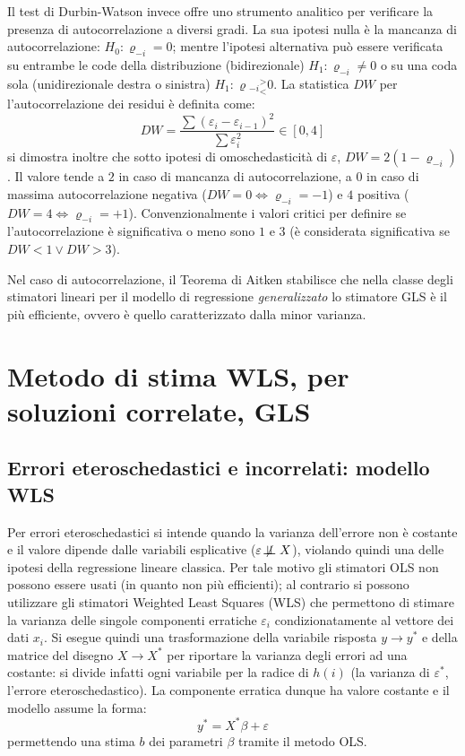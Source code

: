 \documentclass[a4page, 11pt]{article} %
\def\dep{\not\!\perp\!\!\!\perp}  %
\begin{document}
Il test di Durbin-Watson invece offre uno strumento analitico per verificare la presenza di autocorrelazione a diversi gradi.
La sua ipotesi nulla è la mancanza di autocorrelazione: $H_0: \varrho_{-i} = 0$; mentre l'ipotesi alternativa può essere verificata su entrambe le code della distribuzione (bidirezionale) $H_1: \varrho_{-i} \neq 0$ o su una coda sola (unidirezionale destra o sinistra) $H_1: \varrho{_{-i}} ^>_< 0$.
La statistica $DW$ per l'autocorrelazione dei residui è definita come:
\begin{equation*}
  DW = \frac{\sum{(\varepsilon_i - \varepsilon_{i-1})^2}}{\sum{ \varepsilon_i^2}} \in [0, 4]
\end{equation*}
si dimostra inoltre che sotto ipotesi di omoschedasticità di $\varepsilon$, $DW = 2(1 - \varrho_{-i})$.
Il valore tende a $2$ in caso di mancanza di autocorrelazione, a $0$ in caso di massima autocorrelazione negativa ($DW = 0 \Leftrightarrow \varrho_{-i} = -1$) e $4$ positiva ($DW = 4 \Leftrightarrow \varrho_{-i} = +1$).
Convenzionalmente i valori critici per definire se l'autocorrelazione è significativa o meno sono $1$ e $3$ (è considerata significativa se $DW < 1 \lor DW > 3$).

Nel caso di autocorrelazione, il Teorema di Aitken stabilisce che nella classe degli stimatori lineari per il modello di regressione \textit{generalizzato} lo stimatore GLS è il più efficiente, ovvero è quello caratterizzato dalla minor varianza.

\section{Metodo di stima WLS, per soluzioni correlate, GLS }
\subsection*{Errori eteroschedastici e incorrelati: modello WLS}
Per errori eteroschedastici si intende quando la varianza dell’errore non è costante e il valore dipende dalle variabili esplicative ($\varepsilon \dep X$), violando quindi una delle ipotesi della regressione lineare classica.
Per tale motivo gli stimatori OLS non possono essere usati (in quanto non più efficienti); al contrario si possono utilizzare gli stimatori Weighted Least Squares (WLS) che permettono di stimare la varianza delle singole componenti erratiche $\varepsilon_i$ condizionatamente al vettore dei dati $x_i$.
Si esegue quindi una trasformazione della variabile risposta $y \rightarrow y^*$ e della matrice del disegno $X \rightarrow X^*$ per riportare la varianza degli errori ad una costante: si divide infatti ogni variabile per la radice di $h(i)$ (la varianza di $\varepsilon^*$, l'errore eteroschedastico).
La componente erratica dunque ha valore costante e il modello assume la forma:
\begin{equation*}
y^* = X^*\beta + \varepsilon
\end{equation*}
permettendo una stima $b$ dei parametri $\beta$ tramite il metodo OLS.
\end{document}

